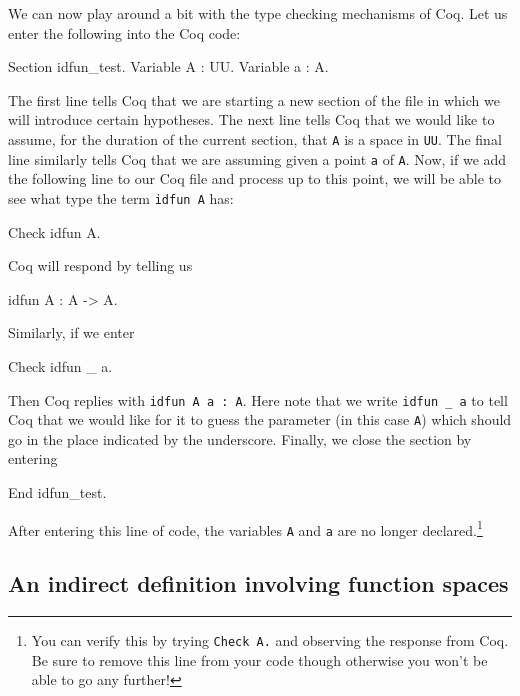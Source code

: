 We can now play around a bit with the type checking mechanisms of
Coq.  Let us enter the following into the Coq code:
\begin{center}
  \begin{coqcode}
Section idfun_test.    
Variable A : UU.
Variable a : A.
  \end{coqcode}
\end{center}
The first line tells Coq that we are starting a new section of the
file in which we will introduce certain hypotheses.  The next line
tells Coq that we would like to assume, for the duration of the
current section, that \verb|A| is a space in \verb|UU|.  The
final line similarly tells Coq that we are assuming given a point
\verb|a| of \verb|A|.  Now, if we add the following line to
our Coq file and process up to this point, we will be able to see what
type the term \verb|idfun A| has:
\begin{center}
  \begin{coqcode}
Check idfun A.
  \end{coqcode}
\end{center}
Coq will respond by telling us 
\begin{center}
  \begin{coqcode}
idfun A : A -> A.
  \end{coqcode}
\end{center}
Similarly, if we enter
\begin{center}
  \begin{coqcode}
Check idfun _ a.
  \end{coqcode}
\end{center}
Then Coq replies with \verb|idfun A a : A|.  Here note that we
write \verb|idfun _ a| to tell Coq that we would like for it to
guess the parameter (in this case \verb|A|) which should go
in the place indicated by the underscore.  Finally, we close the
section by entering
\begin{center}
  \begin{coqcode}
End idfun_test.
  \end{coqcode}
\end{center}
After entering this line of code, the variables \verb|A| and
\verb|a| are no longer declared.\footnote{You can verify this by
  trying \texttt{Check A.} and observing the response from Coq.
  Be sure to remove this line from your code though otherwise you
  won't be able to go any further!}

\subsection{An indirect definition involving function spaces}

